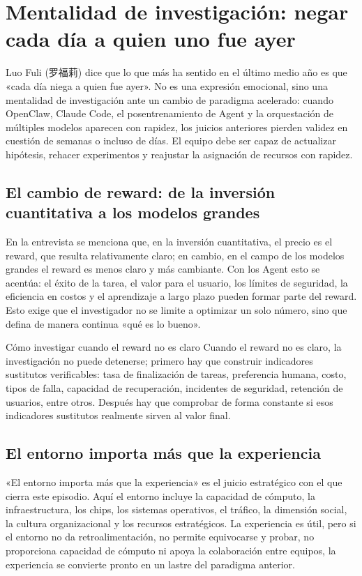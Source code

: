 \section{Mentalidad de investigación: negar cada día a quien uno fue ayer}

Luo Fuli (罗福莉) dice que lo que más ha sentido en el último medio año es que «cada día niega a quien fue ayer». No es una expresión emocional, sino una mentalidad de investigación ante un cambio de paradigma acelerado: cuando OpenClaw, Claude Code, el posentrenamiento de Agent y la orquestación de múltiples modelos aparecen con rapidez, los juicios anteriores pierden validez en cuestión de semanas o incluso de días. El equipo debe ser capaz de actualizar hipótesis, rehacer experimentos y reajustar la asignación de recursos con rapidez.

\subsection{El cambio de reward: de la inversión cuantitativa a los modelos grandes}

En la entrevista se menciona que, en la inversión cuantitativa, el precio es el reward, que resulta relativamente claro; en cambio, en el campo de los modelos grandes el reward es menos claro y más cambiante. Con los Agent esto se acentúa: el éxito de la tarea, el valor para el usuario, los límites de seguridad, la eficiencia en costos y el aprendizaje a largo plazo pueden formar parte del reward. Esto exige que el investigador no se limite a optimizar un solo número, sino que defina de manera continua «qué es lo bueno».

\begin{knowledgebox}{Cómo investigar cuando el reward no es claro}
Cuando el reward no es claro, la investigación no puede detenerse; primero hay que construir indicadores sustitutos verificables: tasa de finalización de tareas, preferencia humana, costo, tipos de falla, capacidad de recuperación, incidentes de seguridad, retención de usuarios, entre otros. Después hay que comprobar de forma constante si esos indicadores sustitutos realmente sirven al valor final.
\end{knowledgebox}

\subsection{El entorno importa más que la experiencia}

«El entorno importa más que la experiencia» es el juicio estratégico con el que cierra este episodio. Aquí el entorno incluye la capacidad de cómputo, la infraestructura, los chips, los sistemas operativos, el tráfico, la dimensión social, la cultura organizacional y los recursos estratégicos. La experiencia es útil, pero si el entorno no da retroalimentación, no permite equivocarse y probar, no proporciona capacidad de cómputo ni apoya la colaboración entre equipos, la experiencia se convierte pronto en un lastre del paradigma anterior.

